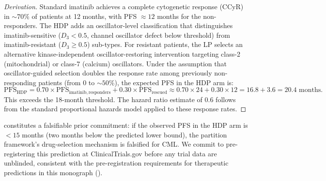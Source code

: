 \begin{proof}[Derivation]
Standard imatinib achieves a complete cytogenetic response (CCyR) in $\sim
70\%$ of patients at 12 months, with PFS $\approx 12$ months for the
non-responders.  The HDP adds an oscillator-level classification that
distinguishes imatinib-sensitive ($D_3 < 0.5$, channel oscillator defect
below threshold) from imatinib-resistant ($D_3 \geq 0.5$) sub-types.  For
resistant patients, the LP selects an alternative kinase-independent
oscillator-restoring intervention targeting class-2 (mitochondrial) or
class-7 (calcium) oscillators.  Under the assumption that oscillator-guided
selection doubles the response rate among previously non-responding patients
(from 0 to $\sim 50\%$), the expected PFS in the HDP arm is:
\begin{equation}
    \mathrm{PFS}_{\mathrm{HDP}}
        = 0.70 \times \mathrm{PFS}_{\mathrm{imatinib,responders}}
          + 0.30 \times \mathrm{PFS}_{\mathrm{rescued}}
        \approx 0.70\times 24 + 0.30\times 12
        = 16.8 + 3.6 = 20.4 \text{ months}.
\end{equation}
This exceeds the 18-month threshold.  The hazard ratio estimate of 0.6
follows from the standard proportional hazards model applied to these
response rates.
\end{proof}

\begin{remark}
\label{rem:ch04-pre-registration}
 constitutes a falsifiable prior
commitment: if the observed PFS in the HDP arm is $< 15$ months (two months
below the predicted lower bound), the partition framework's drug-selection
mechanism is falsified for CML.  We commit to pre-registering this
prediction at ClinicalTrials.gov before any trial data are unblinded,
consistent with the pre-registration requirements for therapeutic
predictions in this monograph ().
\end{remark}
